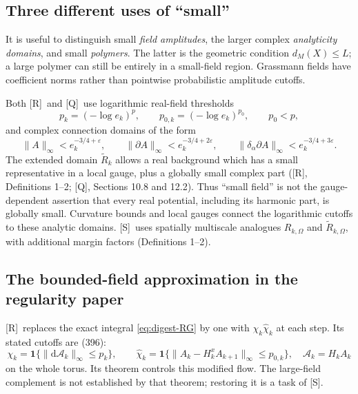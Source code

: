 \documentclass[11pt]{article}
\numberwithin{equation}{section}
\newcommand{\dd}{\mathrm d}
\newcommand{\Q}{\textup{[Q]}}
\newcommand{\UR}{\textup{[R]}}
\newcommand{\US}{\textup{[S]}}
\begin{document}
\subsection{Three different uses of ``small''}

It is useful to distinguish small \emph{field amplitudes}, the larger
complex \emph{analyticity domains}, and small \emph{polymers}.
The latter is the geometric condition $d_M(X)\le L$; a large polymer
can still be entirely in a small-field region.
Grassmann fields have coefficient norms rather than pointwise
probabilistic amplitude cutoffs.

Both \UR\ and \Q\ use logarithmic real-field thresholds
\begin{equation}
 p_k=(-\log e_k)^p,\qquad p_{0,k}=(-\log e_k)^{p_0},
 \qquad p_0<p,
\end{equation}
and complex connection domains of the form
\begin{equation}
 \|A\|_\infty<e_k^{-3/4+\varepsilon},\qquad
 \|\partial A\|_\infty<e_k^{-3/4+2\varepsilon},\qquad
 \|\delta_\alpha\partial A\|_\infty<e_k^{-3/4+3\varepsilon}.
 \label{eq:digest-domain}
\end{equation}
The extended domain $\widetilde R_k$ allows a real background which
has a small representative in a local gauge, plus a globally small
complex part (\UR, Definitions 1--2; \Q, Sections 10.8 and 12.2).
Thus ``small field'' is not the gauge-dependent assertion that every
real potential, including its harmonic part, is globally small.
Curvature bounds and local gauges connect the logarithmic cutoffs to
these analytic domains. \US\ uses spatially multiscale analogues
$R_{k,\Omega}$ and $\widetilde R_{k,\Omega}$, with additional margin
factors (Definitions 1--2).

\subsection{The bounded-field approximation in the regularity paper}

\UR\ replaces the exact integral \eqref{eq:digest-RG} by one with
$\chi_k\widehat\chi_k$ at each step. Its stated cutoffs are (396):
\begin{equation}
 \chi_k=\mathbf1\{\|\dd\mathcal A_k\|_\infty\le p_k\},\qquad
 \widehat\chi_k=
  \mathbf1\{\|A_k-H_k^xA_{k+1}\|_\infty\le p_{0,k}\},
 \quad \mathcal A_k=H_kA_k
 \label{eq:digest-D-cutoffs}
\end{equation}
on the whole torus. Its theorem controls this modified flow. The
large-field complement is not established by that theorem; restoring
it is a task of \US.
\end{document}
